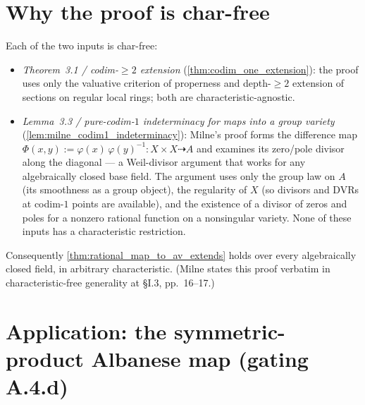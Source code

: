 \section{Why the proof is char-free}
\label{sec:thm32_char_free}

Each of the two inputs is char-free:
\begin{itemize}
  \item \emph{Theorem~3.1 / codim-\(\geq 2\) extension} (\cref{thm:codim_one_extension}):
    the proof uses only the valuative criterion of properness and depth-\(\geq 2\) extension
    of sections on regular local rings; both are characteristic-agnostic.
  \item \emph{Lemma~3.3 / pure-codim-\(1\) indeterminacy for maps into a group variety}
    (\cref{lem:milne_codim1_indeterminacy}): Milne's proof forms the difference map
    \(\Phi(x, y) := \varphi(x)\,\varphi(y)^{-1} \colon X \times X \dashrightarrow A\) and
    examines its zero/pole divisor along the diagonal --- a Weil-divisor argument that
    works for any algebraically closed base field. The argument uses only the group law
    on \(A\) (its smoothness as a group object), the regularity of \(X\) (so divisors and
    DVRs at codim-\(1\) points are available), and the existence of a divisor of zeros and
    poles for a nonzero rational function on a nonsingular variety. None of these inputs
    has a characteristic restriction.
\end{itemize}
Consequently \cref{thm:rational_map_to_av_extends} holds over every algebraically closed
field, in arbitrary characteristic. (Milne states this proof verbatim in characteristic-free
generality at \S I.3, pp.~16--17.)

\section{Application: the symmetric-product Albanese map (gating A.4.d)}
\label{sec:thm32_application_to_a4d}

